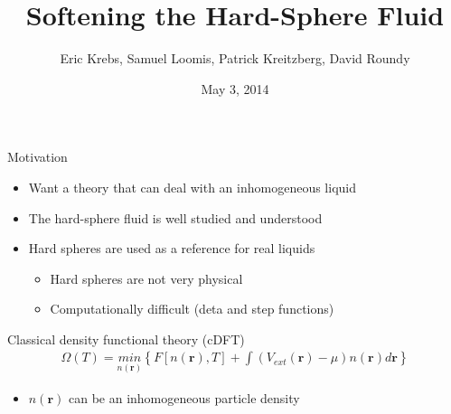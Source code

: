 \documentclass{beamer}
\title{Softening the Hard-Sphere Fluid}
\author{Eric Krebs, Samuel Loomis, Patrick Kreitzberg, David Roundy}
\institute{Oregon State University}
\date{May 3, 2014}
\newcommand{\rr}{\textbf{r}}
\begin{document}
\begin{frame}
 \titlepage
\end{frame}

\begin{frame}{Motivation}
  \begin{itemize}
    \item Want a theory that can deal with an inhomogeneous liquid
    \item The hard-sphere fluid is well studied and understood
    \item Hard spheres are used as a reference for real liquids
      \begin{itemize}
        \item Hard spheres are not very physical
        \item Computationally difficult (deta and step functions)
      \end{itemize}
  \end{itemize}
  \begin{block}{Classical density functional theory (cDFT)}
    \begin{align}
    \Omega(T) = \underset{n(\rr)}{min} \left\{F[n(\rr),T] + \int
                \left(V_{ext}(\rr) - \mu \right)n(\rr)d\rr \right\}
    \end{align}
    \begin{itemize}
      \item $n(\rr)$ can be an inhomogeneous particle density
    \end{itemize}
  \end{block}
\end{frame}
\end{document}
